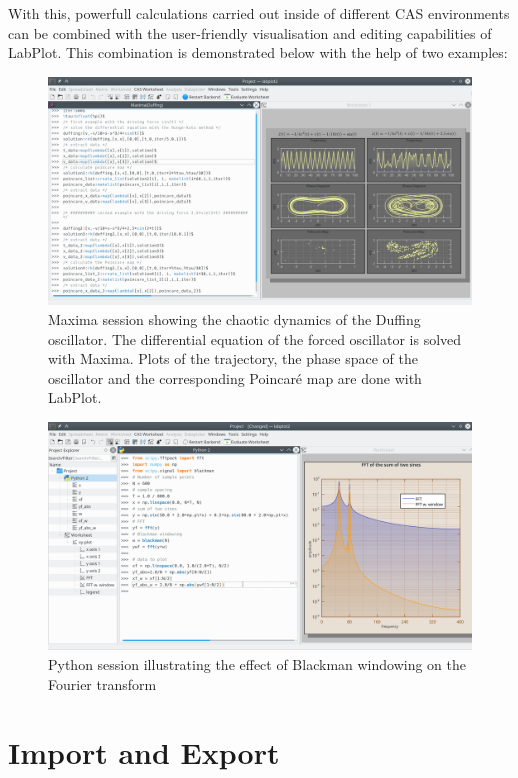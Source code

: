 With this, powerfull calculations carried out inside of different CAS environments can be combined with the user-friendly visualisation and editing capabilities of LabPlot. This combination is demonstrated below with the help of two examples:
\begin{figure}
\includegraphics[width=\textwidth]{images/maxima_session.png}
\caption{Maxima session showing the chaotic dynamics of the Duffing oscillator. The differential equation of the forced oscillator is solved with Maxima. Plots of the trajectory, the phase space of the oscillator and the corresponding Poincaré map are done with LabPlot.}
\end{figure}

\begin{figure}
\includegraphics[width=\textwidth]{images/python_session.png}
\caption{Python session illustrating the effect of Blackman windowing on the Fourier transform}
\end{figure}



\chapter{Import and Export}\label{ch:import_export}
